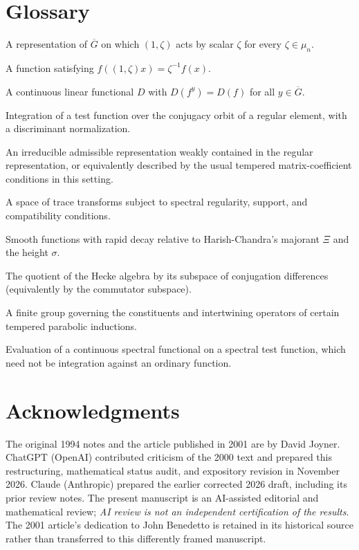 \documentclass[12pt,letterpaper]{article}
\theoremstyle{definition}
\theoremstyle{remark}
\newcommand{\bG}{\overline{G}}
\begin{document}
\section*{Glossary}\label{sec:glossary}
\begin{description}[leftmargin=3.4cm,style=nextline]
\item[Genuine representation] A representation of $\bG$ on which
$(1,\zeta)$ acts by scalar $\zeta$ for every $\zeta\in\mu_n$.
\item[Genuine test function] A function satisfying $f((1,\zeta)x)=\zeta^{-1}f(x)$.
\item[Invariant distribution] A continuous linear functional $D$
with $D(f^y)=D(f)$ for all $y\in\bG$.
\item[Orbital integral] Integration of a test function over the
conjugacy orbit of a regular element, with a discriminant normalization.
\item[Tempered representation] An irreducible admissible representation
weakly contained in the regular representation, or equivalently described
by the usual tempered matrix-coefficient conditions in this setting.
\item[Paley--Wiener space] A space of trace transforms subject to
spectral regularity, support, and compatibility conditions.
\item[Schwartz space] Smooth functions with rapid decay relative to
Harish-Chandra's majorant $\Xi$ and the height $\sigma$.
\item[Cocenter] The quotient of the Hecke algebra by its subspace of
conjugation differences (equivalently by the commutator subspace).
\item[$R$-group] A finite group governing the constituents and
intertwining operators of certain tempered parabolic inductions.
\item[Distributional pairing] Evaluation of a continuous spectral
functional on a spectral test function, which need not be integration
against an ordinary function.
\end{description}

\section*{Acknowledgments}
The original 1994 notes and the article published in 2001 are by David
Joyner.  ChatGPT (OpenAI) contributed criticism of the 2000 text and
prepared this restructuring, mathematical status audit, and expository
revision in November 2026.  Claude (Anthropic) prepared the earlier
corrected 2026 draft, including its prior review notes.  The present
manuscript is an AI-assisted editorial and mathematical review;
\emph{AI review is not an independent certification of the results}.
The 2001 article's dedication to John Benedetto is retained in its
historical source rather than transferred to this differently framed
manuscript.
\end{document}
